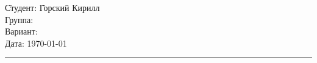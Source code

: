 \begin{tabbing}
	\hspace{11cm} \= Студент: \= Горский Кирилл \\ %
	\> Группа:  \\  %
	\> Вариант:  \\    %
	\> Дата: \> \today     %
\end{tabbing}
\hrule
\vspace{1cm}
